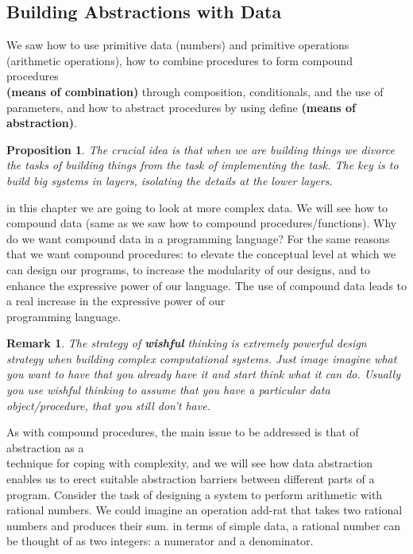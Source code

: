 \documentclass[a4paper,twoside]{article}
\newtheorem{proposition}[theorem]{Proposition}
\newtheorem{remark}[theorem]{Remark}
\numberwithin{equation}{section}
\begin{document}
\subsection{Building Abstractions with Data}
We saw how to use primitive data (numbers) and primitive operations (arithmetic operations),
how to combine procedures to form compound procedures \\ \textbf{(means of combination)} through
composition, conditionals, and the use of parameters, and how to abstract procedures by using define
\textbf{(means of abstraction)}.
\begin{proposition}
    The crucial idea is that when we are building things we divorce the tasks of building things
    from the task of implementing the task. The key is to build big systems in layers, isolating
    the details at the lower layers.
\end{proposition}
in this chapter we are going to look at more complex data. We will see how to compound data (same as
we saw how to compound procedures/functions).\newline
Why do we want compound data in a programming language? For the same reasons that we want compound
procedures: to elevate the conceptual level at which we can design our programs, to increase the
modularity of our designs, and to enhance the expressive power of our
language. The use of compound data leads to a real increase in the expressive power of our \\
programming language.
\begin{remark}
    The strategy of \textbf{wishful} thinking is extremely powerful design strategy when building complex computational systems. Just image imagine what you want to have that you already have it and start think what it can do. Usually you use wishful thinking to assume that you have a particular data object/procedure, that you still don't have.
\end{remark}
As with compound procedures, the main issue to be addressed is that of abstraction as a \\
technique for coping with complexity, and we will see how data abstraction enables us to erect suitable
abstraction barriers between different parts of a program.\newline
Consider the task of designing a system to perform arithmetic with rational numbers.
We could imagine an operation add-rat that takes two rational numbers and produces their sum.
in terms of simple data, a rational number can be thought of as two integers: a numerator and a denominator.
\end{document}
